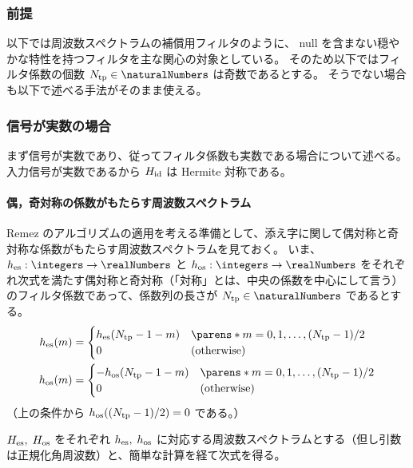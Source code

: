        \subsubsection{前提}
            以下では周波数スペクトラムの補償用フィルタのように、 null を含まない穏やかな特性を持つフィルタを主な関心の対象としている。
            そのため以下ではフィルタ係数の個数 $\Ntp\in\naturalNumbers$ は奇数であるとする。
            そうでない場合も以下で述べる手法がそのまま使える。
        \subsubsection{信号が実数の場合}
            まず信号が実数であり、従ってフィルタ係数も実数である場合について述べる。
            入力信号が実数であるから $H_{\text{id}}$ は Hermite 対称である。
            \paragraph{偶，奇対称の係数がもたらす周波数スペクトラム}
                \label{偶，奇対称の係数がもたらす周波数スペクトラム}
                Remez のアルゴリズムの適用を考える準備として、添え字に関して偶対称と奇対称な係数がもたらす周波数スペクトラムを見ておく。
                いま、$\hes:\integers\to\realNumbers$ と $\hos:\integers\to\realNumbers$ をそれぞれ次式を満たす偶対称と奇対称（「対称」とは、中央の係数を中心にして言う）のフィルタ係数であって、係数列の長さが $\Ntp\in\naturalNumbers$ であるとする。
                \begin{align*}
                    \hes(m) &= \begin{cases}
                        \hes(\Ntp-1-m) & \parens*{m =0,1,\dots,(\Ntp-1)/2} \\
                        0 & (\text{otherwise})
                    \end{cases} \\
                    \hos(m) &= \begin{cases}
                        -\hos(\Ntp-1-m) & \parens*{m =0,1,\dots,(\Ntp-1)/2} \\
                        0 & (\text{otherwise})
                    \end{cases}
                \end{align*}
                （上の条件から $h_{\text{os}}((N_{\text{tp}}-1)/2) = 0$ である。）
                \par
                $H_{\text{es}},\;H_{\text{os}}$ をそれぞれ $h_{\text{es}},\;h_{\text{os}}$ に対応する周波数スペクトラムとする（但し引数は正規化角周波数）と、簡単な計算を経て次式を得る。
